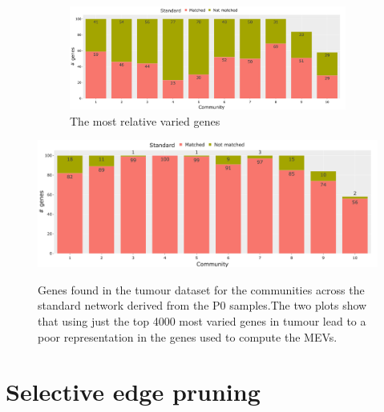\begin{figure}[H]
    \centering
    \begin{subfigure}[b]{1.0\textwidth}
        \includegraphics[width=\textwidth,keepaspectratio]{Sections/Network_I/Resources/P0/4K_p0_modConMev_rep_standard_4K_50TF_v3.png}
        \caption{The most relative varied genes}
        \label{fig:ap:std_p0_mev_sel_rep}
    \end{subfigure}
    \includegraphics[width=\textwidth,keepaspectratio]{Sections/Network_I/Resources/P0/13K_p0_modConMev_rep_standard_4K_50TF_v3.png}
    \label{fig:ap:std_p0_mev_all_rep}
    \caption{Genes found in the tumour dataset for the communities across the standard network derived from the P0 samples.The two plots show that using just the top 4000 most varied genes in tumour lead to a poor representation in the genes used to compute the MEVs.}
    \label{fig:ap:std_p0_mev_rep}
\end{figure}

\section{Selective edge pruning} \label{s:ap:sel_prun}

